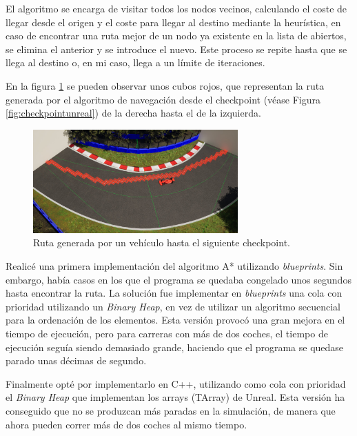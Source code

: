 \bigskip

El algoritmo se encarga de visitar todos los nodos vecinos, calculando el coste de llegar desde el origen y el coste para llegar al destino mediante la heurística, en caso de encontrar una ruta mejor de un nodo ya existente en la lista de abiertos, se elimina el anterior y se introduce el nuevo. Este proceso se repite hasta que se llega al destino o, en mi caso, llega a un límite de iteraciones.

\bigskip

En la figura \ref{fig:rutaastar} se pueden observar unos cubos rojos, que representan la ruta generada por el algoritmo de navegación desde el checkpoint (véase Figura \ref{fig:checkpointunreal}) de la derecha hasta el de la izquierda.

\begin{figure}[H]
    \centering
    \includegraphics[width=0.7\textwidth]{imagenes/converted/rutaAStar.jpg}
    \caption{Ruta generada por un vehículo hasta el siguiente checkpoint.}
    \label{fig:rutaastar}
\end{figure}


Realicé una primera implementación del algoritmo A* utilizando \textit{blueprints}. Sin embargo, había casos en los que el programa se quedaba congelado unos segundos hasta encontrar la ruta. La solución fue implementar en \textit{blueprints} una cola con prioridad utilizando un \textit{Binary Heap}, en vez de utilizar un algoritmo secuencial para la ordenación de los elementos. Esta versión provocó una gran mejora en el tiempo de ejecución, pero para carreras con más de dos coches, el tiempo de ejecución seguía siendo demasiado grande, haciendo que el programa se quedase parado unas décimas de segundo.

\bigskip

Finalmente opté por implementarlo en C++, utilizando como cola con prioridad el \textit{Binary Heap} que implementan los arrays (TArray) de Unreal. Esta versión ha conseguido que no se produzcan más paradas en la simulación, de manera que ahora pueden correr más de dos coches al mismo tiempo.

